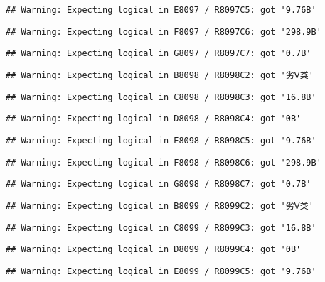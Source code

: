 \documentclass[
]{article}
\begin{document}
\begin{verbatim}
## Warning: Expecting logical in E8097 / R8097C5: got '9.76B'
\end{verbatim}

\begin{verbatim}
## Warning: Expecting logical in F8097 / R8097C6: got '298.9B'
\end{verbatim}

\begin{verbatim}
## Warning: Expecting logical in G8097 / R8097C7: got '0.7B'
\end{verbatim}

\begin{verbatim}
## Warning: Expecting logical in B8098 / R8098C2: got '劣Ⅴ类'
\end{verbatim}

\begin{verbatim}
## Warning: Expecting logical in C8098 / R8098C3: got '16.8B'
\end{verbatim}

\begin{verbatim}
## Warning: Expecting logical in D8098 / R8098C4: got '0B'
\end{verbatim}

\begin{verbatim}
## Warning: Expecting logical in E8098 / R8098C5: got '9.76B'
\end{verbatim}

\begin{verbatim}
## Warning: Expecting logical in F8098 / R8098C6: got '298.9B'
\end{verbatim}

\begin{verbatim}
## Warning: Expecting logical in G8098 / R8098C7: got '0.7B'
\end{verbatim}

\begin{verbatim}
## Warning: Expecting logical in B8099 / R8099C2: got '劣Ⅴ类'
\end{verbatim}

\begin{verbatim}
## Warning: Expecting logical in C8099 / R8099C3: got '16.8B'
\end{verbatim}

\begin{verbatim}
## Warning: Expecting logical in D8099 / R8099C4: got '0B'
\end{verbatim}

\begin{verbatim}
## Warning: Expecting logical in E8099 / R8099C5: got '9.76B'
\end{verbatim}
\end{document}
